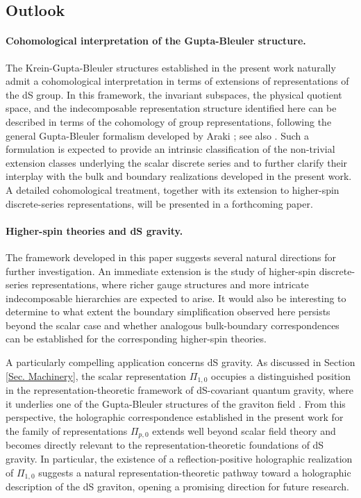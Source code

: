 \documentclass[aps,twocolumn,nofootinbib]{revtex4}
\begin{document}
{%
\subsection{Outlook}

\paragraph{Cohomological interpretation of the Gupta-Bleuler structure.} The Krein-Gupta-Bleuler structures established in the present work naturally admit a cohomological interpretation in terms of extensions of representations of the dS group. In this framework, the invariant subspaces, the physical quotient space, and the indecomposable representation structure identified here can be described in terms of the cohomology of group representations, following the general Gupta-Bleuler formalism developed by Araki \cite{Araki-1985-97}; see also \cite{Pierotti-1990-31, Simon-1980}. Such a formulation is expected to provide an intrinsic classification of the non-trivial extension classes underlying the scalar discrete series and to further clarify their interplay with the bulk and boundary realizations developed in the present work. A detailed cohomological treatment, together with its extension to higher-spin discrete-series representations, will be presented in a forthcoming paper.

\paragraph{Higher-spin theories and dS gravity.} The framework developed in this paper suggests several natural directions for further investigation. An immediate extension is the study of higher-spin discrete-series representations, where richer gauge structures and more intricate indecomposable hierarchies are expected to arise. It would also be interesting to determine to what extent the boundary simplification observed here persists beyond the scalar case and whether analogous bulk-boundary correspondences can be established for the corresponding higher-spin theories.

A particularly compelling application concerns dS gravity. As discussed in Section \ref{Sec. Machinery}, the scalar representation $\Pi_{1,0}$ occupies a distinguished position in the representation-theoretic framework of dS-covariant quantum gravity, where it underlies one of the Gupta-Bleuler structures of the graviton field \cite{Pejhan2019}. From this perspective, the holographic correspondence established in the present work for the family of representations $\Pi_{p,0}$ extends well beyond scalar field theory and becomes directly relevant to the representation-theoretic foundations of dS gravity. In particular, the existence of a reflection-positive holographic realization of $\Pi_{1,0}$ suggests a natural representation-theoretic pathway toward a holographic description of the dS graviton, opening a promising direction for future research.

}
\end{document}
